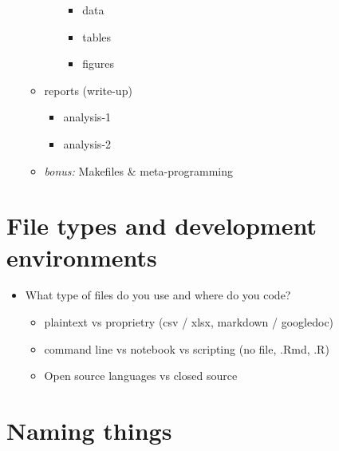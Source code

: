 \documentclass[
  12pt,
]{book}
\providecommand{\tightlist}{%
  \setlength{\itemsep}{0pt}\setlength{\parskip}{0pt}}
\theoremstyle{definition}
\theoremstyle{definition}
\theoremstyle{definition}
\theoremstyle{definition}
\theoremstyle{remark}
\begin{document}
\begin{itemize}
\begin{itemize}
\begin{itemize}
      \begin{itemize}
      \tightlist
      \item
        data
      \item
        tables
      \item
        figures
      \end{itemize}
    \end{itemize}
  \item
    reports (write-up)

    \begin{itemize}
    \tightlist
    \item
      analysis-1
    \item
      analysis-2
    \end{itemize}
  \item
    \emph{bonus:} Makefiles \& meta-programming
  \end{itemize}
\end{itemize}

\hypertarget{file-types-and-development-environments}{%
\section{File types and development environments}\label{file-types-and-development-environments}}

\begin{itemize}
\tightlist
\item
  What type of files do you use and where do you code?

  \begin{itemize}
  \tightlist
  \item
    plaintext vs proprietry (csv / xlsx, markdown / googledoc)
  \item
    command line vs notebook vs scripting (no file, .Rmd, .R)
  \item
    Open source languages vs closed source
  \end{itemize}
\end{itemize}

\hypertarget{naming-things}{%
\section{Naming things}\label{naming-things}}
\end{document}

